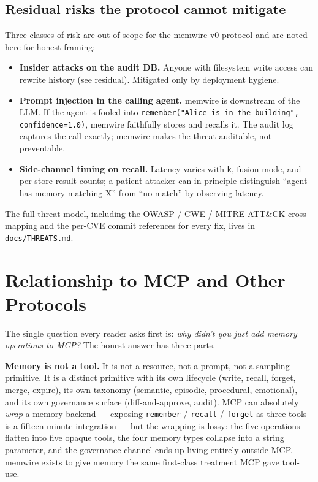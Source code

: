 \documentclass[11pt,letterpaper,twocolumn]{article}
\begin{document}
\subsection{Residual risks the protocol cannot mitigate}
\label{sec:threats-residual}

Three classes of risk are out of scope for the memwire v0 protocol and are noted here for honest framing:

\begin{itemize}[leftmargin=*]
  \item \textbf{Insider attacks on the audit DB.} Anyone with filesystem write access can rewrite history (see  residual). Mitigated only by deployment hygiene.
  \item \textbf{Prompt injection in the calling agent.} memwire is downstream of the LLM. If the agent is fooled into \texttt{remember("Alice is in the building", confidence=1.0)}, memwire faithfully stores and recalls it. The audit log captures the call exactly; memwire makes the threat auditable, not preventable.
  \item \textbf{Side-channel timing on recall.} Latency varies with \texttt{k}, fusion mode, and per-store result counts; a patient attacker can in principle distinguish ``agent has memory matching X'' from ``no match'' by observing latency.
\end{itemize}

The full threat model, including the OWASP / CWE / MITRE ATT\&CK cross-mapping and the per-CVE commit references for every fix, lives in \texttt{docs/THREATS.md}.

\section{Relationship to MCP and Other Protocols}
\label{sec:mcp}

The single question every reader asks first is: \emph{why didn't you just add memory operations to MCP?} The honest answer has three parts.

\textbf{Memory is not a tool.} It is not a resource, not a prompt, not a sampling primitive. It is a distinct primitive with its own lifecycle (write, recall, forget, merge, expire), its own taxonomy (semantic, episodic, procedural, emotional), and its own governance surface (diff-and-approve, audit). MCP can absolutely \emph{wrap} a memory backend --- exposing \texttt{remember} / \texttt{recall} / \texttt{forget} as three tools is a fifteen-minute integration --- but the wrapping is lossy: the five operations flatten into five opaque tools, the four memory types collapse into a string parameter, and the governance channel ends up living entirely outside MCP. memwire exists to give memory the same first-class treatment MCP gave tool-use.
\end{document}
